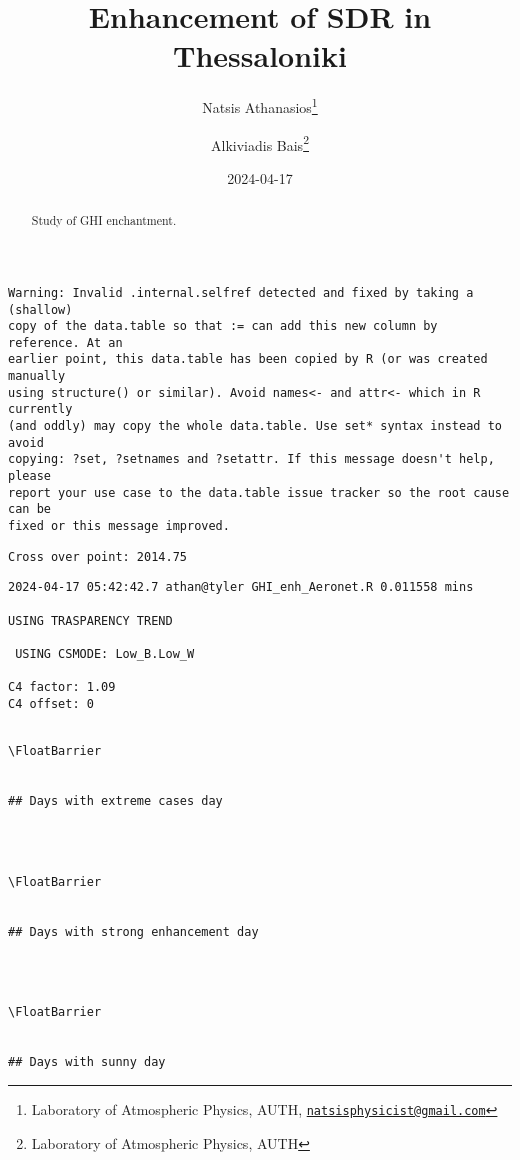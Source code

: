 \documentclass[
  10pt,
  a4paper,oneside]{article}
\title{Enhancement of SDR in Thessaloniki}
\author{Natsis Athanasios\footnote{Laboratory of Atmospheric Physics, AUTH, \href{mailto:natsisphysicist@gmail.com}{\nolinkurl{natsisphysicist@gmail.com}}} \and Alkiviadis Bais\footnote{Laboratory of Atmospheric Physics, AUTH}}
\date{2024-04-17}
\begin{document}
\maketitle
\begin{abstract}
Study of GHI enchantment.
\end{abstract}

{
\hypersetup{linkcolor=}
\setcounter{tocdepth}{4}
\tableofcontents
}
\begin{verbatim}
Warning: Invalid .internal.selfref detected and fixed by taking a (shallow)
copy of the data.table so that := can add this new column by reference. At an
earlier point, this data.table has been copied by R (or was created manually
using structure() or similar). Avoid names<- and attr<- which in R currently
(and oddly) may copy the whole data.table. Use set* syntax instead to avoid
copying: ?set, ?setnames and ?setattr. If this message doesn't help, please
report your use case to the data.table issue tracker so the root cause can be
fixed or this message improved.
\end{verbatim}

\begin{verbatim}
Cross over point: 2014.75 
\end{verbatim}

\begin{verbatim}
2024-04-17 05:42:42.7 athan@tyler GHI_enh_Aeronet.R 0.011558 mins

USING TRASPARENCY TREND

 USING CSMODE: Low_B.Low_W 

C4 factor: 1.09 
C4 offset: 0 
\end{verbatim}

\begin{verbatim}

\FloatBarrier


## Days with extreme cases day 
\end{verbatim}

\begin{verbatim}
 
 

\FloatBarrier


## Days with strong enhancement day 
\end{verbatim}

\begin{verbatim}
 
 

\FloatBarrier


## Days with sunny day 
\end{verbatim}
\end{document}
